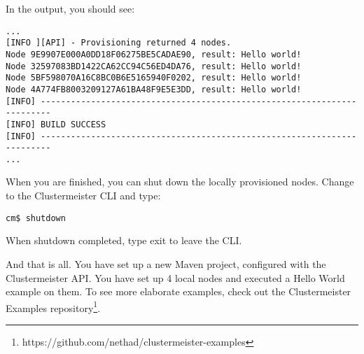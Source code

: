 \documentclass[english]{uzhpub}
\begin{document}
In the output, you should see:

\begin{lstlisting}[breaklines=true, backgroundcolor=\color{lbcolor}]
...
[INFO ][API] - Provisioning returned 4 nodes.
Node 9E9907E000A0DD18F06275BE5CADAE90, result: Hello world!
Node 32597083BD1422CA62CC94C56ED4DA76, result: Hello world!
Node 5BF598070A16C8BC0B6E5165940F0202, result: Hello world!
Node 4A774FB8003209127A61BA48F9E5E3DD, result: Hello world!
[INFO] ------------------------------------------------------------------------
[INFO] BUILD SUCCESS
[INFO] ------------------------------------------------------------------------
...
\end{lstlisting}

When you are finished, you can shut down the locally provisioned nodes. Change to the Clustermeister CLI and type:

\begin{lstlisting}[breaklines=true, backgroundcolor=\color{lbcolor}]
cm$ shutdown
\end{lstlisting}

When shutdown completed, type exit to leave the CLI.

And that is all. You have set up a new Maven project, configured with the Clustermeister API. You have set up 4 local nodes and executed a Hello World example on them. To see more elaborate examples, check out the Clustermeister Examples repository\footnote{https://github.com/nethad/clustermeister-examples}.
\end{document}
